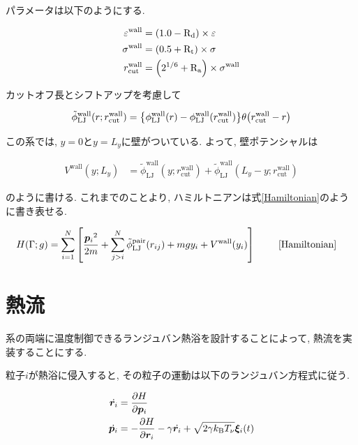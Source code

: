 パラメータは以下のようにする.

\begin{align}
  \varepsilon^{\text{wall}} &= \qty(1.0 - \text{R}_\text{d}) \times \varepsilon \\
  \sigma^{\text{wall}} &= \qty(0.5 + \text{R}_\text{t}) \times \sigma \\
  r^{\text{wall}}_{\text{cut}} &= \qty(2^{1/6} + \text{R}_\text{a}) \times \sigma^{\text{wall}}
\end{align}

カットオフ長とシフトアップを考慮して

\begin{align}
  \tilde{\phi}_{\text{LJ}}^{\text{wall}}(r;r_{\text{cut}}^{\text{wall}}) = \qty{\phi_{\text{LJ}}^{\text{wall}}(r) - \phi_{\text{LJ}}^{\text{wall}}(r_{\text{cut}}^{\text{wall}})}\theta \qty(r_{\text{cut}}^{\text{wall}}-r) \\
\end{align}

この系では, $y=0$と$y=L_y$に壁がついている. よって, 壁ポテンシャルは

\begin{align}
  V^{\text{wall}}(y; L_y) &= \tilde{\phi}_{\text{LJ}}^{\text{wall}}(y;r_{\text{cut}}^{\text{wall}}) + \tilde{\phi}_{\text{LJ}}^{\text{wall}}(L_y - y;r_{\text{cut}}^{\text{wall}})
\end{align}

のように書ける. これまでのことより, ハミルトニアンは式\eqref{Hamiltonian}のように書き表せる.

\begin{align}
    H(\Gamma; g)
    &= \sum_{i=1}^{N}
    \left[
      \frac{{\bm{p}_i}^2}{2m} 
      + \sum_{j > i}^{N}
        \tilde{\phi}_{\text{LJ}}^{\text{pair}}(r_{ij})
      + mgy_i +V^{\text{wall}}(y_i)
    \right] \ \tag*{\eqref{Hamiltonian}} 
\end{align}

\section{熱流}

系の両端に温度制御できるランジュバン熱浴を設計することによって, 熱流を実装することにする.

粒子$i$が熱浴に侵入すると, その粒子の運動は以下のランジュバン方程式に従う. 

\begin{align}
  \label{langevin_r}
  \dot{\bm{r}_i} &= \pdv{H}{\bm{p}_i} \\
  \label{langevin_p}
  \dot{\bm{p}_i} &= - \pdv{H}{\bm{r}_i} - \gamma \dot{\bm{r}_i} + \sqrt{2 \gamma k_{\text{B}}T_{\nu}}\bm{\xi}_i (t) 
\end{align}

